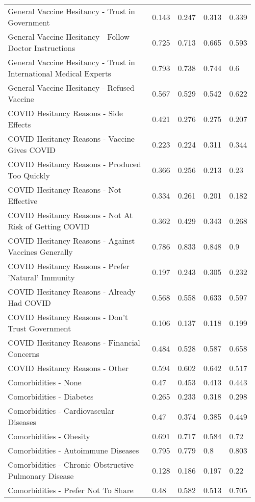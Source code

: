 \begin{table}[ht]
\begin{tabular}{lllll}
  General Vaccine Hesitancy - Trust in Government & 0.143 & 0.247 & 0.313 & 0.339 \\ 
  General Vaccine Hesitancy - Follow Doctor Instructions & 0.725 & 0.713 & 0.665 & 0.593 \\ 
  General Vaccine Hesitancy - Trust in International Medical Experts & 0.793 & 0.738 & 0.744 & 0.6 \\ 
  General Vaccine Hesitancy - Refused Vaccine & 0.567 & 0.529 & 0.542 & 0.622 \\ 
  COVID Hesitancy Reasons - Side Effects & 0.421 & 0.276 & 0.275 & 0.207 \\ 
  COVID Hesitancy Reasons - Vaccine Gives COVID & 0.223 & 0.224 & 0.311 & 0.344 \\ 
  COVID Hesitancy Reasons - Produced Too Quickly & 0.366 & 0.256 & 0.213 & 0.23 \\ 
  COVID Hesitancy Reasons - Not Effective & 0.334 & 0.261 & 0.201 & 0.182 \\ 
  COVID Hesitancy Reasons - Not At Risk of Getting COVID & 0.362 & 0.429 & 0.343 & 0.268 \\ 
  COVID Hesitancy Reasons - Against Vaccines Generally & 0.786 & 0.833 & 0.848 & 0.9 \\ 
  COVID Hesitancy Reasons - Prefer 'Natural' Immunity & 0.197 & 0.243 & 0.305 & 0.232 \\ 
  COVID Hesitancy Reasons - Already Had COVID & 0.568 & 0.558 & 0.633 & 0.597 \\ 
  COVID Hesitancy Reasons - Don't Trust Government & 0.106 & 0.137 & 0.118 & 0.199 \\ 
  COVID Hesitancy Reasons - Financial Concerns & 0.484 & 0.528 & 0.587 & 0.658 \\ 
  COVID Hesitancy Reasons - Other & 0.594 & 0.602 & 0.642 & 0.517 \\ 
  Comorbidities - None & 0.47 & 0.453 & 0.413 & 0.443 \\ 
  Comorbidities - Diabetes & 0.265 & 0.233 & 0.318 & 0.298 \\ 
  Comorbidities - Cardiovascular Diseases & 0.47 & 0.374 & 0.385 & 0.449 \\ 
  Comorbidities - Obesity & 0.691 & 0.717 & 0.584 & 0.72 \\ 
  Comorbidities - Autoimmune Diseases & 0.795 & 0.779 & 0.8 & 0.803 \\ 
  Comorbidities - Chronic Obstructive Pulmonary Disease & 0.128 & 0.186 & 0.197 & 0.22 \\ 
  Comorbidities - Prefer Not To Share & 0.48 & 0.582 & 0.513 & 0.705 \\ 

\end{tabular}
\end{table}
